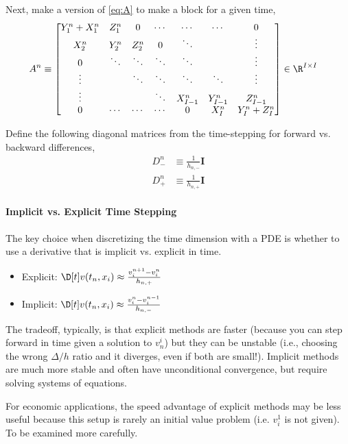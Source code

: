 \documentclass[11pt]{etk-article}
\begin{document}
Next, make a version of \cref{eq:A} to make a block for a given time,
\begin{align}
A^n &\equiv \begin{bmatrix}
Y^n_1 + X^n_1 & Z^n_1 & 0 & \cdots & \cdots & \cdots & 0 \\
X^n_2 & Y^n_2 & Z^n_2 & 0 & \ddots& & \vdots \\
0 & \ddots & \ddots & \ddots & \ddots &  & \vdots \\
\vdots & &\ddots & \ddots & \ddots & \ddots  & \vdots \\
\vdots & & & \ddots & X^n_{I-1} & Y^n_{I-1}  & Z^n_{I-1} \\
0 & \cdots & \cdots & \cdots & 0 & X^n_I & Y^n_I+Z^n_I\\
\end{bmatrix}\in\R^{I\times I}\label{eq:A-t}
\end{align}

Define the following diagonal matrices from the time-stepping for forward vs. backward differences,
\begin{align}
D_{-}^n &\equiv \frac{1}{h_{n,-}} \mathbf{I}\\
D_{+}^n &\equiv \frac{1}{h_{n,+}} \mathbf{I}
\end{align}

\paragraph{Implicit vs. Explicit Time Stepping}
The key choice when discretizing the time dimension with a PDE is whether to use a derivative that is implicit vs. explicit in time.
\begin{itemize}
	\item Explicit: $\D[t]v(t_n,x_i) \approx \frac{v^{n+1}_i - v^n_i}{h_{n,+}}$
	\item Implicit: $\D[t]v(t_n,x_i) \approx \frac{v^n_i - v^{n-1}_i}{h_{n,-}}$
\end{itemize}
The tradeoff, typically, is that explicit methods are faster (because you can step forward in time given a solution to $v_n^i$) but they can be unstable (i.e., choosing the wrong $\Delta/h$ ratio and it diverges, even if both are small!).  Implicit methods are much more stable and often have unconditional convergence, but require solving systems of equations.

For economic applications, the speed advantage of explicit methods may be less useful because this setup is rarely an initial value problem (i.e. $v^1_i$ is not given).  To be examined more carefully.
\end{document}
